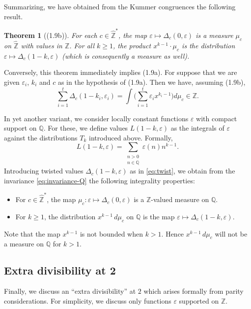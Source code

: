 \documentclass[12pt,a4paper]{article}
\theoremstyle{plain}
\newtheorem{theorem}{Theorem}[section]
\theoremstyle{definition}
\newcommand{\Z}{\mathbb{Z}}
\newcommand{\Q}{\mathbb{Q}}
\begin{document}
Summarizing, we have obtained from the Kummer congruences the following result.

\begin{theorem}[(1.9b)]\label{thm:kummer-b}
For each $c\in\hat{\Z}^*$, the map $\varepsilon\mapsto\Delta_c(0,\varepsilon)$ is a measure $\mu_c$ on $\hat{\Z}$ with values in $\Z$. For all $k\ge1$, the product $x^{k-1}\cdot\mu_c$ is the distribution $\varepsilon\mapsto\Delta_c(1-k,\varepsilon)$ (which is consequently a measure as well).
\end{theorem}

Conversely, this theorem immediately implies (1.9a). For suppose that we are given $\varepsilon_i$, $k_i$ and $c$ as in the hypothesis of (1.9a). Then we have, assuming (1.9b),
\[
\sum_{i=1}^{t}\Delta_c(1-k_i,\varepsilon_i)=\int\Big(\sum_{i=1}^{t}\varepsilon_i x^{k_i-1}\Big)d\mu_c\in\Z.
\]

In yet another variant, we consider locally constant functions $\varepsilon$ with compact support on $\Q$. For these, we define values $L(1-k,\varepsilon)$ as the integrals of $\varepsilon$ against the distributions $T_k$ introduced above. Formally,
\begin{equation}\label{eq:L-compact}
L(1-k,\varepsilon)=\sum_{\substack{n>0\\n\in\Q}}\varepsilon(n)n^{k-1}.
\end{equation}
Introducing twisted values $\Delta_c(1-k,\varepsilon)$ as in \eqref{eq:twist}, we obtain from the invariance \eqref{eq:invariance-Q} the following integrality properties:

\begin{itemize}
\item[(1.11)] For $c\in\hat{\Z}^*$, the map $\mu_c:\varepsilon\mapsto\Delta_c(0,\varepsilon)$ is a $\Z$-valued measure on $\Q$.
\item[(1.12)] For $k\ge1$, the distribution $x^{k-1}\,d\mu_c$ on $\Q$ is the map $\varepsilon\mapsto\Delta_c(1-k,\varepsilon)$.
\end{itemize}

Note that the map $x^{k-1}$ is not bounded when $k>1$. Hence $x^{k-1}\,d\mu_c$ will not be a measure on $\Q$ for $k>1$.

\subsection*{Extra divisibility at 2}

Finally, we discuss an ``extra divisibility'' at $2$ which arises formally from parity considerations. For simplicity, we discuss only functions $\varepsilon$ supported on $\Z$.
\end{document}
